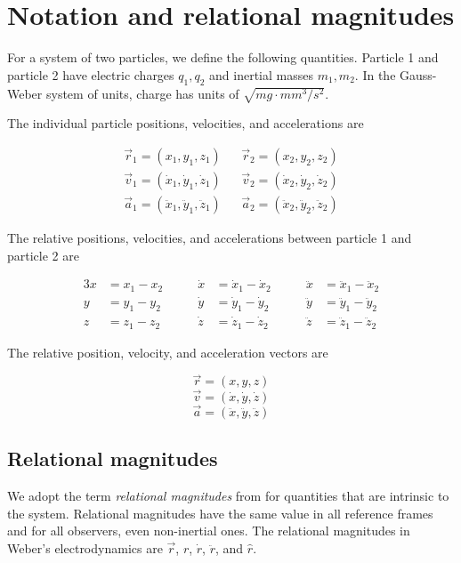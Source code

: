 \documentclass[12pt,a4paper]{article}
\theoremstyle{definition}
\theoremstyle{remark}
\begin{document}
\appendix

\section{Notation and relational magnitudes}\label{app:notation}
For a system of two particles, we define the following quantities. Particle 1 and particle 2 have electric charges $q_1, q_2$ and inertial masses $m_1, m_2$. In the Gauss-Weber system of units, charge has units of $\sqrt{mg \cdot mm^3 / s^2}$.

The individual particle positions, velocities, and accelerations are

\begin{align*}
    \vec{r}_1 = (x_1, y_1, z_1)                      &  & \vec{r}_2 = (x_2, y_2, z_2)                      \\
    \vec{v}_1 = (\dot{x}_1, \dot{y}_1, \dot{z}_1)    &  & \vec{v}_2 = (\dot{x}_2, \dot{y}_2, \dot{z}_2)    \\
    \vec{a}_1 = (\ddot{x}_1, \ddot{y}_1, \ddot{z}_1) &  & \vec{a}_2 = (\ddot{x}_2, \ddot{y}_2, \ddot{z}_2)
\end{align*}

The relative positions, velocities, and accelerations between particle 1 and particle 2 are

\begin{alignat*}{3}
    x & = x_1 - x_2 \qquad & \dot{x} & = \dot{x}_1 - \dot{x}_2 \qquad & \ddot{x} & = \ddot{x}_1 - \ddot{x}_2 \\
    y & = y_1 - y_2 \qquad & \dot{y} & = \dot{y}_1 - \dot{y}_2 \qquad & \ddot{y} & = \ddot{y}_1 - \ddot{y}_2 \\
    z & = z_1 - z_2 \qquad & \dot{z} & = \dot{z}_1 - \dot{z}_2 \qquad & \ddot{z} & = \ddot{z}_1 - \ddot{z}_2
\end{alignat*}

The relative position, velocity, and acceleration vectors are

\[\vec{r} = (x, y, z)\]
\[\vec{v} = (\dot{x}, \dot{y}, \dot{z})\]
\[\vec{a} = (\ddot{x}, \ddot{y}, \ddot{z})\]

\subsection{Relational magnitudes}\label{app:additional-remarks}
We adopt the term \textit{relational magnitudes} from \citep{assis-relational-mechanics} for quantities that are intrinsic to the system. Relational magnitudes have the same value in all reference frames and for all observers, even non-inertial ones. The relational magnitudes in Weber's electrodynamics are $\vec{r}$, $r$, $\dot{r}$, $\ddot{r}$, and $\hat{r}$.
\end{document}
